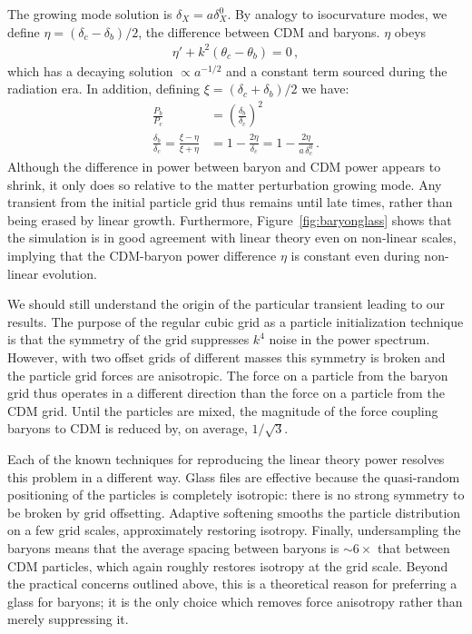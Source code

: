 \documentclass[a4paper,11pt]{article}
\newcommand{\YF}[1]{\textcolor{green}{[\bf YF: #1]} }
\begin{document}
The growing mode solution is $\delta_X = a \delta_X^0$. By analogy to isocurvature modes, we define $\eta = (\delta_c - \delta_b)/2$, the difference between CDM and baryons. $\eta$ obeys
\begin{align}
 \eta' + k^2 (\theta_c - \theta_b) = 0\,,
\end{align}
which has a decaying solution $\propto a^{-1/2}$ and a constant term sourced during the radiation era. In addition, defining $\xi = (\delta_c + \delta_b) / 2$ we have:
\begin{align}
 \frac{P_b} {P_c} &= \left(\frac{\delta_b} {\delta_c}\right)^2 \\
\frac{\delta_b} {\delta_c} = \frac{\xi - \eta} {\xi + \eta} & = 1 - \frac{ 2 \eta} {\delta_c} = 1 - \frac{ 2 \eta} {a \,\delta_c^0}\,.
\end{align}
Although the difference in power between baryon and CDM power appears to shrink, it only does so relative to the matter perturbation growing mode. Any transient from the initial particle grid thus remains until late times, rather than being erased by linear growth. Furthermore, Figure~\ref{fig:baryonglass} shows that the simulation is in good agreement with linear theory even on non-linear scales, implying that the CDM-baryon power difference $\eta$ is constant even during non-linear evolution.

We should still understand the origin of the particular transient leading to our results. The purpose of the regular cubic grid as a particle initialization technique is that the symmetry of the grid suppresses $k^4$ noise in the power spectrum. However, with two offset grids of different masses this symmetry is broken and the particle grid forces are anisotropic. The force on a particle from the baryon grid thus operates in a different direction than the force on a particle from the CDM grid. Until the particles are mixed, the magnitude of the force coupling baryons to CDM is reduced by, on average, $1/\sqrt{3}$.

Each of the known techniques for reproducing the linear theory power resolves this problem in a different way. Glass files are effective because the quasi-random positioning of the particles is completely isotropic: there is no strong symmetry to be broken by grid offsetting. Adaptive softening smooths the particle distribution on a few grid scales, approximately restoring isotropy. Finally, undersampling the baryons means that the average spacing between baryons is $\sim 6\times$ that between CDM particles, which again roughly restores isotropy at the grid scale. Beyond the practical concerns outlined above, this is a theoretical reason for preferring a glass for baryons; it is the only choice which removes force anisotropy rather than merely suppressing it.
\end{document}
